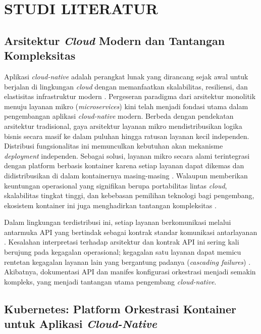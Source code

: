 ﻿\cleardoublepage %

\chapter{STUDI LITERATUR}
\label{chap:studi-literatur}

\section{Arsitektur \textit{Cloud} Modern dan Tantangan Kompleksitas}

Aplikasi \textit{cloud-native} adalah perangkat lunak yang dirancang sejak awal untuk berjalan di lingkungan \textit{cloud} dengan memanfaatkan skalabilitas, resiliensi, dan elastisitas infrastruktur modern \parencite{soldani_pains_2018}. Pergeseran paradigma dari arsitektur monolitik menuju layanan mikro (\textit{microservices}) kini telah menjadi fondasi utama dalam pengembangan aplikasi \textit{cloud-native} modern. Berbeda dengan pendekatan arsitektur tradisional, gaya arsitektur layanan mikro mendistribusikan logika bisnis secara masif ke dalam puluhan hingga ratusan layanan kecil independen. Distribusi fungsionalitas ini memunculkan kebutuhan akan mekanisme \textit{deployment} independen. Sebagai solusi, layanan mikro secara alami terintegrasi dengan platform berbasis kontainer karena setiap layanan dapat dikemas dan didistribusikan di dalam kontainernya masing-masing \parencite{soldani_pains_2018}. Walaupun memberikan keuntungan operasional yang signifikan berupa portabilitas lintas \textit{cloud}, skalabilitas tingkat tinggi, dan kebebasan pemilihan teknologi bagi pengembang, ekosistem kontainer ini juga menghadirkan tantangan kompleksitas \parencite{soldani_pains_2018}.

Dalam lingkungan terdistribusi ini, setiap layanan berkomunikasi melalui antarmuka API yang bertindak sebagai kontrak standar komunikasi antarlayanan \parencite{soldani_pains_2018}. Kesalahan interpretasi terhadap arsitektur dan kontrak API ini sering kali berujung pada kegagalan operasional; kegagalan satu layanan dapat memicu rentetan kegagalan layanan lain yang bergantung padanya (\textit{cascading failures}) \parencite{soldani_pains_2018}. Akibatnya, dokumentasi API dan manifes konfigurasi orkestrasi menjadi semakin kompleks, yang menjadi tantangan utama pengembang \textit{cloud-native}.

\section{Kubernetes: Platform Orkestrasi Kontainer untuk Aplikasi \textit{Cloud-Native}}

